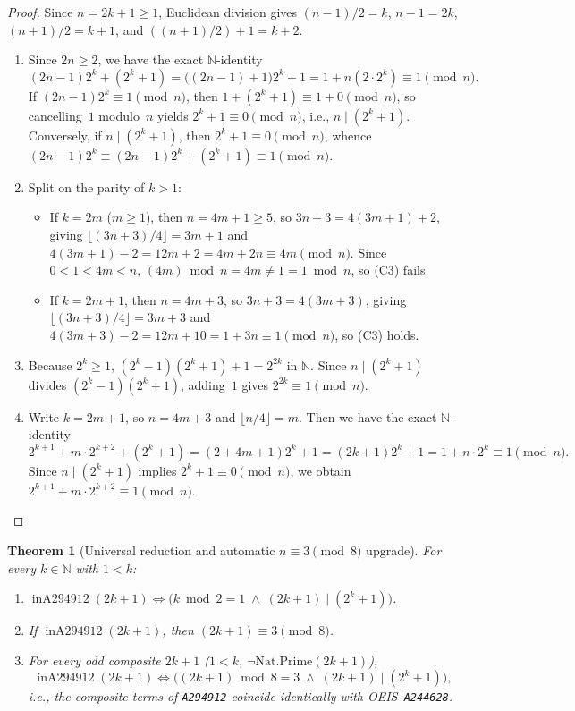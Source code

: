 \documentclass[11pt]{article}
\newtheorem{theorem}{Theorem}[section]
\theoremstyle{definition}
\newcommand{\N}{\mathbb{N}}
\newcommand{\seq}[1]{\texttt{#1}}
\newcommand{\inA}{\operatorname{inA294912}}
\begin{document}
\begin{proof}
Since $n = 2k + 1 \ge 1$, Euclidean division gives $(n - 1)/2 = k$, $n - 1 = 2k$, $(n + 1)/2 = k + 1$, and $((n + 1)/2) + 1 = k + 2$.
\begin{enumerate}
\item[\textup{(a)}] Since $2n \ge 2$, we have the exact $\N$-identity
\[
(2n - 1)2^k + (2^k + 1) = \bigl((2n - 1) + 1\bigr)2^k + 1 = 1 + n(2 \cdot 2^k) \equiv 1 \pmod n.
\]
If $(2n - 1)2^k \equiv 1 \pmod n$, then $1 + (2^k + 1) \equiv 1 + 0 \pmod n$, so cancelling~$1$ modulo~$n$ yields $2^k + 1 \equiv 0 \pmod n$, i.e., $n \mid (2^k + 1)$. Conversely, if $n \mid (2^k + 1)$, then $2^k + 1 \equiv 0 \pmod n$, whence $(2n - 1)2^k \equiv (2n - 1)2^k + (2^k + 1) \equiv 1 \pmod n$.
\item[\textup{(b)}] Split on the parity of $k > 1$:
\begin{itemize}
\item If $k = 2m$ ($m \ge 1$), then $n = 4m + 1 \ge 5$, so $3n + 3 = 4(3m + 1) + 2$, giving $\lfloor (3n + 3)/4 \rfloor = 3m + 1$ and $4(3m + 1) - 2 = 12m + 2 = 4m + 2n \equiv 4m \pmod n$. Since $0 < 1 < 4m < n$, $(4m) \bmod n = 4m \ne 1 = 1 \bmod n$, so (C3) fails.
\item If $k = 2m + 1$, then $n = 4m + 3$, so $3n + 3 = 4(3m + 3)$, giving $\lfloor (3n + 3)/4 \rfloor = 3m + 3$ and $4(3m + 3) - 2 = 12m + 10 = 1 + 3n \equiv 1 \pmod n$, so (C3) holds.
\end{itemize}
\item[\textup{(c)}] Because $2^k \ge 1$, $(2^k - 1)(2^k + 1) + 1 = 2^{2k}$ in $\N$. Since $n \mid (2^k + 1)$ divides $(2^k - 1)(2^k + 1)$, adding~$1$ gives $2^{2k} \equiv 1 \pmod n$.
\item[\textup{(d)}] Write $k = 2m + 1$, so $n = 4m + 3$ and $\lfloor n/4 \rfloor = m$. Then we have the exact $\N$-identity
\[
2^{k+1} + m \cdot 2^{k+2} + (2^k + 1) = (2 + 4m + 1)2^k + 1 = (2k + 1)2^k + 1 = 1 + n \cdot 2^k \equiv 1 \pmod n.
\]
Since $n \mid (2^k + 1)$ implies $2^k + 1 \equiv 0 \pmod n$, we obtain $2^{k+1} + m \cdot 2^{k+2} \equiv 1 \pmod n$. \qedhere
\end{enumerate}
\end{proof}

\begin{theorem}[Universal reduction and automatic $n \equiv 3 \pmod 8$ upgrade]
\label{thm:reduction-a244628}
For every $k \in \N$ with $1 < k$:
\begin{enumerate}
\item[\textup{(a)}] $\inA(2k + 1) \iff \bigl(k \bmod 2 = 1 \;\land\; (2k + 1) \mid (2^k + 1)\bigr)$.
\item[\textup{(b)}] If $\inA(2k + 1)$, then $(2k + 1) \equiv 3 \pmod 8$.
\item[\textup{(c)}] For every odd composite $2k + 1$ ($1 < k$, $\neg\mathrm{Nat.Prime}(2k + 1)$),
\[
\inA(2k + 1) \iff \bigl((2k + 1) \bmod 8 = 3 \;\land\; (2k + 1) \mid (2^k + 1)\bigr),
\]
i.e., the composite terms of \seq{A294912} coincide identically with OEIS~\seq{A244628}.
\end{enumerate}
\end{theorem}
\end{document}
